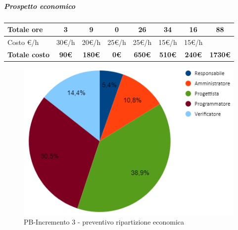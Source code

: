 \subparagraph{Prospetto economico}
\begin{center}
	\renewcommand{\arraystretch}{1.8} %
	\begin{tabular}{ |m{10em}|c|c|c|c|c|c|c| }
	\hline
    Totale ore & 3 & 9 & 0 & 26 & 34 & 16 & \textbf{88}\\
    \hline
    Costo \euro/h & 30\euro/h & 20\euro/h & 25\euro/h & 25\euro/h & 15\euro/h & 15\euro/h & \\
    \hline
    \textbf{Totale costo} & \textbf{90\euro} & \textbf{180\euro} &  \textbf{0\euro} &  \textbf{650\euro} &  \textbf{510\euro} &  \textbf{240\euro} &  \textbf{1730\euro}\\
    \hline
	\end{tabular}

    \begin{figure}[H]
       \centering\includegraphics{images/preventivo/PB-incremento3-costo.png}
       \caption{PB-Incremento 3 - preventivo ripartizione economica}
    \end{figure}
\end{center}



